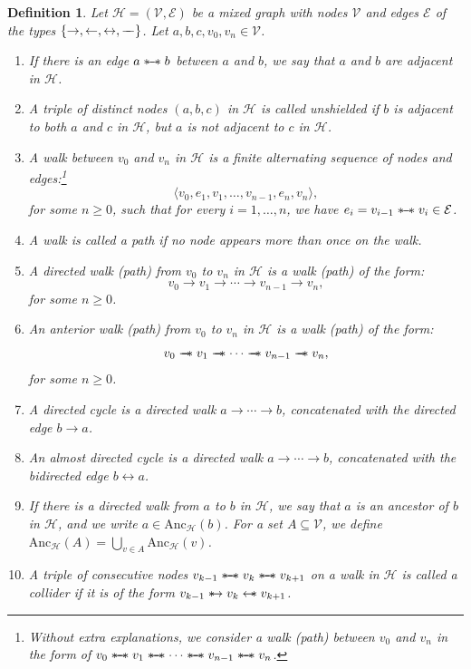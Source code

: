 \documentclass[accepted]{uai2025} %
\newtheorem{definition}{Definition}
\newcommand{\anc}{\text{Anc}}
\newcommand{\tuh}{\mathrel{\rightarrow}}
\newcommand{\hut}{\mathrel{\leftarrow}}
\newcommand{\huh}{\mathrel{\leftrightarrow}}
\newcommand{\hus}{\mathrel{{\leftarrow\mkern-11mu\ast}}}
\newcommand{\suh}{\mathrel{{\ast\mkern-11mu\to}}}
\newcommand{\tus}{\mathrel{{\relbar\mkern-11mu\relbar\mkern-11mu\ast}}}
\newcommand{\sus}{\mathrel{{\ast\mkern-11mu\relbar\mkern-9mu\relbar\mkern-11mu\ast}}}
\newcommand{\tut}{\mathrel{{\relbar\mkern-9mu\relbar}}}
\begin{document}
\begin{definition}
Let $\mathcal{H}=(\mathcal{V},\mathcal{E})$ be a mixed graph with nodes $\mathcal{V}$ and edges $\mathcal{E}$ of the types $\{\tuh, \hut, \huh,\tut\}$. Let $a,b,c,v_0,v_n\in\mathcal{V}$.
\begin{enumerate}
    \item If there is an edge $a\sus b$ between $a$ and $b$, we say that $a$ and $b$ are \emph{adjacent} in $\mathcal{H}$.
    \item A triple of distinct nodes $(a, b, c)$ in $\mathcal{H}$ is called \emph{unshielded} if $b$ is adjacent to both $a$ and $c$ in $\mathcal{H}$, but $a$ is not adjacent to $c$ in $\mathcal{H}$.
    \item A \emph{walk} between $v_0$ and $v_n$ in $\mathcal{H}$ is a finite alternating sequence of nodes and edges:\footnote{Without extra explanations, we consider a walk (path) between $v_0$ and $v_n$ in the form of $v_0\sus v_1\sus\cdots \sus v_{n-1}\sus v_n$.}
    $$
    \langle v_0,e_1,v_1,\ldots,v_{n-1},e_n,v_n\rangle,
    $$
    for some $n\geq0$, such that for every $i=1,\ldots,n$, we have $e_i=v_{i-1}\sus v_i\in\mathcal{E}$.
    \item A walk is called a \emph{path} if no node appears more than once on the walk.
    \item A \emph{directed walk (path)} from $v_0$ to $v_n$ in $\mathcal{H}$ is a walk (path) of the form:
    $$
    v_0\rightarrow v_1\rightarrow\cdots\rightarrow v_{n-1}\rightarrow v_n,
    $$
    for some $n\geq0$.
    \item An \emph{anterior walk (path)} from $v_0$ to $v_n$ in $\mathcal{H}$ is a walk (path) of the form:
    $$
    v_0 \tus v_1 \tus \cdots\tus v_{n-1}\tus v_n,
    $$
    for some $n\geq0$.
    \item A \emph{directed cycle} is a directed walk $a\rightarrow\cdots\rightarrow b$, concatenated with the directed edge $b\rightarrow a$.
    \item An \emph{almost directed cycle} is a directed walk $a\rightarrow\cdots\rightarrow b$, concatenated with the bidirected edge $b\huh  a$.
    \item If there is a directed walk from $a$ to $b$ in $\mathcal{H}$, we say that $a$ is an ancestor of $b$ in $\mathcal{H}$, and we write $a\in\anc_\mathcal{H}(b)$. For a set $A\subseteq\mathcal{V}$, we define $\anc_\mathcal{H}(A)=\bigcup_{v\in A}\anc_\mathcal{H}(v)$.
    \item A triple of consecutive nodes $v_{k-1}\sus v_k\sus v_{k+1}$ on a walk in $\mathcal{H}$ is called a \emph{collider} if it is of the form $v_{k-1}\suh v_k \hus v_{k+1}$.

\end{enumerate}
\end{definition}
\end{document}
